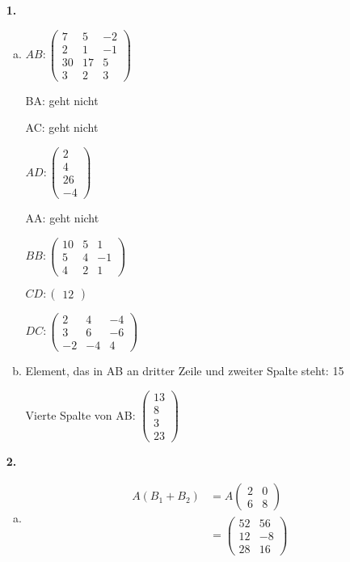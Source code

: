 \documentclass[a4paper]{scrartcl}
\title{\titleinfo}
\author{Elena Noll, Sven-Hendrik Haase, Arne Feil}
\date{\today}
\begin{document}
\maketitle

\begin{enumerate}
\item[\textbf{1.}]
\begin{enumerate}[a)]
\item
$AB:\begin{pmatrix}
7 & 5 & -2 \\
2 & 1 & -1 \\
30 & 17 & 5 \\
3 & 2 & 3
\end{pmatrix}$

BA: geht nicht

AC: geht nicht

$AD:\begin{pmatrix}
2 \\
4 \\
26 \\
-4
\end{pmatrix}$

AA: geht nicht

$BB:\begin{pmatrix}
10 & 5 & 1 \\
5 & 4 & -1 \\
4 & 2 & 1
\end{pmatrix}$

$CD:\begin{pmatrix}
12
\end{pmatrix}$

$DC:\begin{pmatrix}
2 & 4 & -4 \\
3 & 6 & -6 \\
-2 & -4 & 4
\end{pmatrix}$

\item
Element, das in AB an dritter Zeile und zweiter Spalte steht: 15

Vierte Spalte von AB: $\begin{pmatrix}
13 \\
8 \\
3 \\
23
\end{pmatrix}$
\end{enumerate}

\item[\textbf{2.}]
\begin{enumerate}[a)]
\item
\begin{align}
A(B_1+B_2)
& = A\begin{pmatrix}
2 & 0 \\
6 & 8
\end{pmatrix}\\ 
& = \begin{pmatrix}
52 & 56 \\
12 & -8 \\
28 & 16
\end{pmatrix}
\end{align}


\end{enumerate}
\end{enumerate}
\end{document}
